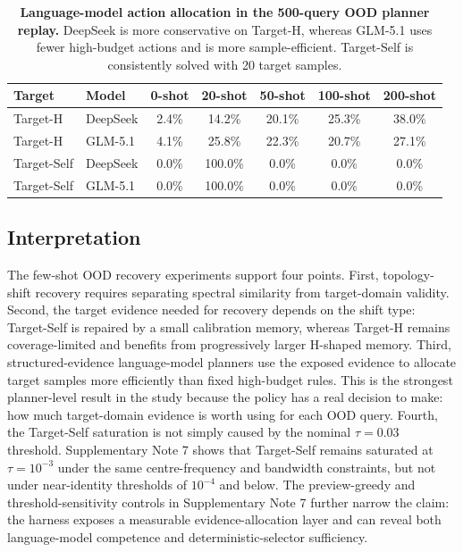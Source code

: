 \documentclass[final,1p,times]{elsarticle}
\begin{document}
\begin{table}[htbp!]
\centering
\caption{\textbf{Language-model action allocation in the 500-query OOD planner replay.}
DeepSeek is more conservative on Target-H, whereas GLM-5.1 uses fewer high-budget actions and is more sample-efficient. Target-Self is consistently solved with 20 target samples.}
\label{tab:si_phase4_action_allocation}
\footnotesize
\setlength{\tabcolsep}{4.2pt}
\renewcommand{\arraystretch}{1.12}
\begin{tabular}{llccccc}
\toprule
Target & Model & 0-shot & 20-shot & 50-shot & 100-shot & 200-shot \\
\midrule
Target-H & DeepSeek & 2.4\% & 14.2\% & 20.1\% & 25.3\% & 38.0\% \\
Target-H & GLM-5.1 & 4.1\% & 25.8\% & 22.3\% & 20.7\% & 27.1\% \\
Target-Self & DeepSeek & 0.0\% & 100.0\% & 0.0\% & 0.0\% & 0.0\% \\
Target-Self & GLM-5.1 & 0.0\% & 100.0\% & 0.0\% & 0.0\% & 0.0\% \\
\bottomrule
\end{tabular}
\end{table}

\subsection{Interpretation}

The few-shot OOD recovery experiments support four points. First, topology-shift recovery requires separating spectral similarity from target-domain validity. Second, the target evidence needed for recovery depends on the shift type: Target-Self is repaired by a small calibration memory, whereas Target-H remains coverage-limited and benefits from progressively larger H-shaped memory. Third, structured-evidence language-model planners use the exposed evidence to allocate target samples more efficiently than fixed high-budget rules. This is the strongest planner-level result in the study because the policy has a real decision to make: how much target-domain evidence is worth using for each OOD query. Fourth, the Target-Self saturation is not simply caused by the nominal $\tau=0.03$ threshold. Supplementary Note 7 shows that Target-Self remains saturated at $\tau=10^{-3}$ under the same centre-frequency and bandwidth constraints, but not under near-identity thresholds of $10^{-4}$ and below. The preview-greedy and threshold-sensitivity controls in Supplementary Note 7 further narrow the claim: the harness exposes a measurable evidence-allocation layer and can reveal both language-model competence and deterministic-selector sufficiency.
\end{document}
